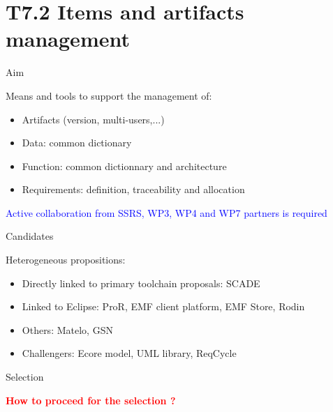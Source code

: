 
\section{T7.2 Items and artifacts management}

\begin{frame}{Aim}

   Means and tools to support the management of:
 
   \begin{itemize}
   \item Artifacts (version, multi-users,...)
   \item Data: common dictionary
   \item Function: common dictionnary and architecture
   \item Requirements: definition, traceability and allocation
   \end{itemize} 


\pause   
   
   \textcolor{blue}{Active collaboration from SSRS, WP3, WP4 and WP7  partners is required}
   
\end{frame}


\begin{frame}{Candidates}

Heterogeneous propositions:

  
   \begin{itemize}
   \item Directly linked to primary toolchain proposals: SCADE
   \item Linked to Eclipse: ProR, EMF client platform, EMF Store, Rodin
   \item Others: Matelo, GSN
   \item Challengers: Ecore model, UML library, ReqCycle
   \end{itemize}
   
   
\end{frame}





\begin{frame}{Selection}

   \textbf{\textcolor{red}{How to proceed for the selection ?}}
 
 
   
   
\end{frame}


